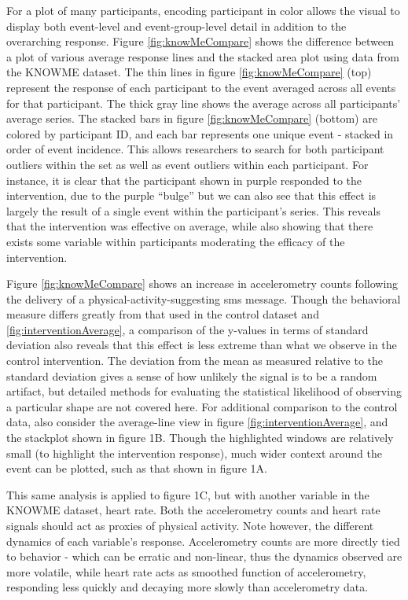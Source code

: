 For a plot of many participants, encoding participant in color allows the visual to display both event-level and event-group-level detail in addition to the overarching response.
Figure \ref{fig:knowMeCompare} shows the difference between a plot of various average response lines and the stacked area plot using data from the KNOWME dataset.
The thin lines in figure \ref{fig:knowMeCompare} (top) represent the response of each participant to the event averaged across all events for that participant.
The thick gray line shows the average across all participants' average series.
The stacked bars in figure \ref{fig:knowMeCompare} (bottom) are colored by participant ID, and each bar represents one unique event - stacked in order of event incidence.
This allows researchers to search for both participant outliers within the set as well as event outliers within each participant.
For instance, it is clear that the participant shown in purple responded to the intervention, due to the purple ``bulge'' but we can also see that this effect is largely the result of a single event within the participant's series.
This reveals that the intervention was effective on average, while also showing that there exists some variable within participants moderating the efficacy of the intervention.

Figure \ref{fig:knowMeCompare} shows an increase in accelerometry counts following the delivery of a physical-activity-suggesting sms message.
Though the behavioral measure differs greatly from that used in the control dataset and \ref{fig:interventionAverage}, a comparison of the y-values in terms of standard deviation also reveals that this effect is less extreme than what we observe in the control intervention.
The deviation from the mean as measured relative to the standard deviation gives a sense of how unlikely the signal is to be a random artifact, but detailed methods for evaluating the statistical likelihood of observing a particular shape are not covered here.
For additional comparison to the control data, also consider the average-line view in figure \ref{fig:interventionAverage}, and the stackplot shown in figure 1B.
Though the highlighted windows are relatively small (to highlight the intervention response), much wider context around the event can be plotted, such as that shown in figure 1A.

This same analysis is applied to figure 1C, but with another variable in the KNOWME dataset, heart rate.
Both the accelerometry counts and heart rate signals should act as proxies of physical activity.
Note however, the different dynamics of each variable's response.
Accelerometry counts are more directly tied to behavior - which can be erratic and non-linear, thus the dynamics observed are more volatile, while heart rate acts as smoothed function of accelerometry, responding less quickly and decaying more slowly than accelerometry data.

